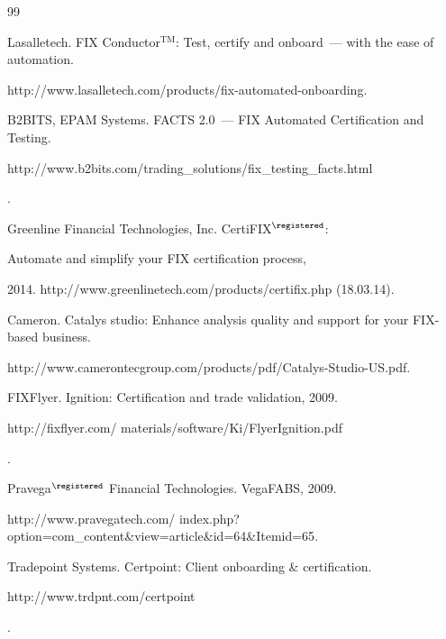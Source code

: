 {{\begin{thebibliography}{99}


Lasalletech. FIX Conductor$^{\mathrm{TM}}$: Test, certify and onboard~--- with the ease of automation.


 {\sf http://www.lasalletech.com/products/fix-automated-onboarding}.







B2BITS, EPAM Systems. FACTS 2.0~--- FIX Automated Certification and Testing.  {\sf


http://www.b2bits.com/trading\_solutions/fix\_testing\_facts.html}.







Greenline Financial Technologies, Inc. CertiFIX$^\registered$:


Automate and simplify your FIX certification process,


 2014. {\sf http://www.greenlinetech.com/products/certifix.php} (18.03.14).







Cameron. Catalys studio: Enhance analysis quality and support for your FIX-based business.


{\sf http://www.camerontecgroup.com/products/pdf/Catalys-Studio-US.pdf}.







FIXFlyer. Ignition: Certification and trade validation,  2009. {\sf


http://fixflyer.com/ materials/software/Ki/FlyerIgnition.pdf}.







Pravega$^\registered$ Financial Technologies. VegaFABS,  2009.


{\sf http://www.pravegatech.com/ index.php?option=com\_content\&view=article\&id=64\&Itemid=65}.







Tradepoint Systems. Certpoint: Client onboarding \& certification.  {\sf


http://www.\linebreak trdpnt.com/certpoint}.






\end{thebibliography}}}
